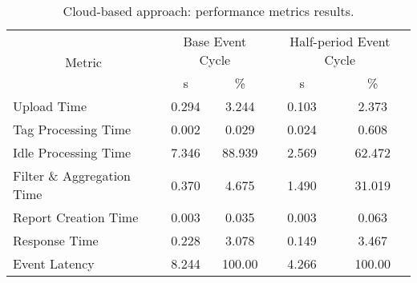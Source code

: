 \begin{table}[ht!]
\centering
\caption{Cloud-based approach: performance metrics results.}
\label{table:cloud_metrics}
\begin{tabular}{|l|c|c|c|c|}
\hline
\multicolumn{1}{|c|}{\multirow{2}{*}{Metric}} & \multicolumn{2}{c|}{Base Event Cycle} & \multicolumn{2}{c|}{Half-period Event Cycle} \\
\multicolumn{1}{|c|}{}                        & s                 & \%                & s                    & \%                    \\ \hline
Upload Time                                   & 0.294             & 3.244             & 0.103                & 2.373                 \\ \hline
Tag Processing Time                           & 0.002             & 0.029             & 0.024                & 0.608                 \\ \hline
Idle Processing Time                          & 7.346             & 88.939            & 2.569                & 62.472                \\ \hline
Filter \& Aggregation Time                    & 0.370             & 4.675             & 1.490                & 31.019                \\ \hline
Report Creation Time                          & 0.003             & 0.035             & 0.003                & 0.063                 \\ \hline
Response Time                                 & 0.228             & 3.078             & 0.149                & 3.467                 \\ \hline
Event Latency                                 & 8.244             & 100.00            & 4.266                & 100.00                \\ \hline
\end{tabular}
\end{table}
